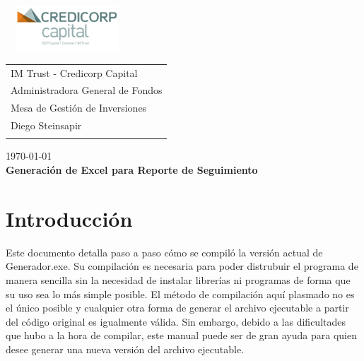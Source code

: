 \documentclass{article}
\begin{document}
\includegraphics[width=4.6cm, height=1.7cm]{logor.png}
\vspace*{-1.55cm}

\hspace*{1.4 cm}
 \hspace*{2.9 cm}
 {\footnotesize
 \begin{tabular}{l}
  \sc IM Trust - Credicorp Capital\\
  \sc Administradora General de Fondos \\
  \sc Mesa de Gestión de Inversiones  \\
  \sc Diego Steinsapir  \\
  \vspace{15\baselineskip}\mbox{}
  \vspace{-3mm}\mbox{}
 \end{tabular}
}

 \bigskip

\vspace*{5mm}
\begin{center}
{\today} \\
\vspace{3mm}
{\Large\bf Generación de Excel para Reporte de Seguimiento} \\
\vspace{2mm}
\end{center}
\section{Introducción}
Este documento detalla paso a paso cómo se compiló la versión actual de Generador.exe. Su compilación es necesaria para poder distrubuir el programa de manera sencilla sin la necesidad de instalar librerías ni programas de forma que su uso sea lo más simple posible. El método de compilación aquí plasmado no es el único posible y cualquier otra forma de generar el archivo ejecutable a partir del código original es igualmente válida. Sin embargo, debido a las dificultades que hubo a la hora de compilar, este manual puede ser de gran ayuda para quien desee generar una nueva versión del archivo ejecutable.
\end{document}
